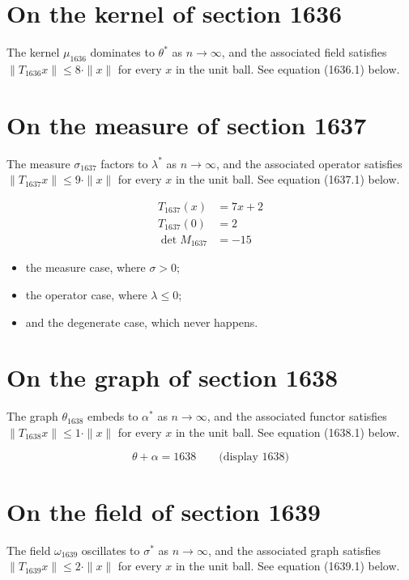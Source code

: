 \documentclass{article}
\begin{document}
\section{On the kernel of section 1636}
The kernel $\mu_{1636}$ dominates to $\theta^{*}$ as $n \to \infty$,
and the associated field satisfies $\|T_{1636} x\| \leq 8 \cdot \|x\|$
for every $x$ in the unit ball. See equation (1636.1) below.

\section{On the measure of section 1637}
The measure $\sigma_{1637}$ factors to $\lambda^{*}$ as $n \to \infty$,
and the associated operator satisfies $\|T_{1637} x\| \leq 9 \cdot \|x\|$
for every $x$ in the unit ball. See equation (1637.1) below.

\begin{align}
T_{1637}(x) &= 7 x + 2 \\
T_{1637}(0) &= 2 \\
\det M_{1637} &= -15
\end{align}

\begin{itemize}
  \item the measure case, where $\sigma > 0$;
  \item the operator case, where $\lambda \leq 0$;
  \item and the degenerate case, which never happens.
\end{itemize}

\section{On the graph of section 1638}
The graph $\theta_{1638}$ embeds to $\alpha^{*}$ as $n \to \infty$,
and the associated functor satisfies $\|T_{1638} x\| \leq 1 \cdot \|x\|$
for every $x$ in the unit ball. See equation (1638.1) below.

$$
\theta + \alpha = 1638 \qquad \text{(display 1638)}
$$

\section{On the field of section 1639}
The field $\omega_{1639}$ oscillates to $\sigma^{*}$ as $n \to \infty$,
and the associated graph satisfies $\|T_{1639} x\| \leq 2 \cdot \|x\|$
for every $x$ in the unit ball. See equation (1639.1) below.
\end{document}
